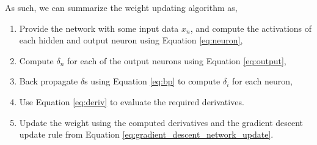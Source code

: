 As such, we can summarize the weight updating algorithm as,

\begin{enumerate}
    \item

        Provide the network with some input data $x_n$, and compute the
        activations of each hidden and output neuron using Equation
        \eqref{eq:neuron},

    \item

        Compute $\delta_n$ for each of the output neurons using Equation
        \eqref{eq:output},

    \item

        Back propagate $\delta$s using Equation \eqref{eq:bp} to compute
        $\delta_i$ for each neuron,

    \item

        Use Equation \eqref{eq:deriv} to evaluate the required derivatives.

    \item

        Update the weight using the computed derivatives
        and the gradient descent update rule from Equation
        \eqref{eq:gradient_descent_network_update}.

\end{enumerate}


